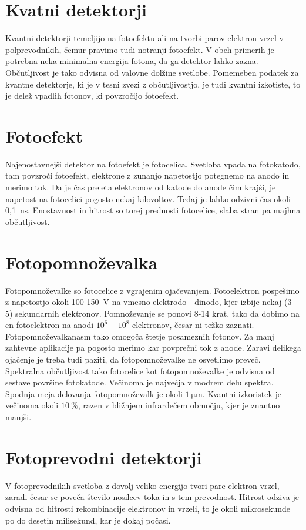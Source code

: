 \section{Kvatni detektorji}

Kvantni detektorji temeljijo na fotoefektu ali na tvorbi parov elektron-vrzel
v polprevodnikih, čemur pravimo tudi notranji fotoefekt. V obeh primerih je potrebna neka
minimalna energija fotona, da ga detektor lahko zazna. Občutljivost je tako odvisna od 
valovne dolžine svetlobe. Pomemeben podatek za kvantne detektorje, ki je v tesni zvezi 
z občutljivostjo, je tudi kvantni izkotiste, to je delež vpadlih fotonov, ki povzročijo fotoefekt.

\section{Fotoefekt}

Najenostavnejši detektor na fotoefekt je fotocelica. Svetloba vpada na fotokatodo, tam povzroči
fotoefekt, elektrone z zunanjo napetostjo potegnemo na anodo in merimo tok. Da je čas preleta
elektronov od katode do anode čim krajši, je napetost na fotocelici pogosto nekaj kilovoltov.
Tedaj je lahko odzivni čas okoli 0,1~ns. Enostavnost in hitrost so torej prednosti fotocelice, slaba
stran pa majhna občutljivost.

\section{Fotopomnoževalka}
Fotopomnoževalke so fotocelice z vgrajenim ojačevanjem. Fotoelektron pospešimo z napetostjo
okoli 100-150~V na vmesno elektrodo - dinodo, kjer izbije nekaj (3-5) sekundarnih elektronov. 
Pomnoževanje se ponovi 8-14 krat, tako da dobimo na en fotoelektron na anodi $10^6 - 10^8$ 
elektronov, česar ni težko zaznati. Fotopomnoževalkanasm tako omogoča štetje posameznih fotonov.
Za manj zahtevne aplikacije pa pogosto merimo kar povprečni tok z anode. Zaravi delikega ojačenje
je treba tudi paziti, da fotopomnoževalke ne osvetlimo preveč. Spektralna občutljivost
tako fotocelice kot fotopomnoževalke je odvisna od sestave površine fotokatode. Večinoma
je največja v modrem delu spektra. Spodnja meja delovanja fotopomnoževalk je okoli $1~\si{\micro\metre}$.
Kvantni izkoristek je večinoma okoli $10~\%$, razen v bližnjem infrardečem območju, kjer
je znantno manjši. 

\section{Fotoprevodni detektorji}
V fotoprevodnikih svetloba z dovolj veliko energijo tvori pare elektron-vrzel, zaradi  česar
se poveča število nosilcev toka in s tem prevodnost. Hitrost odziva je odvisna od hitrosti
rekombinacije elektronov in vrzeli, to je okoli mikrosekunde po do desetin milisekund, kar
je dokaj počasi. 

